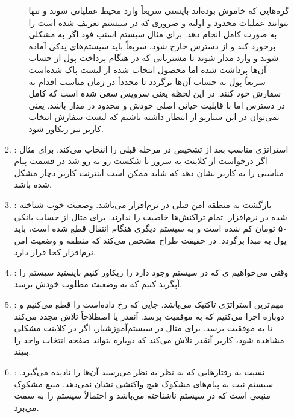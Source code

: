 \begin{enumerate}
\begin{enumerate}
\begin{enumerate}
            گره‌هایی که خاموش بوده‌اند بایستی سریعاً وارد محیط عملیاتی شوند و
            تنها بتوانند عملیات محدود و اولیه و ضروری که در سیستم تعریف شده است
            را به صورت کامل انجام دهد. برای مثال سیستم اسنپ فود اگر به مشکلی
            برخورد کند و از دسترس خارج شود، سریعاً باید سیستم‌های یدکی آماده
            شوند و وارد مدار شوند تا مشتریانی که در هنگام پرداخت پول از حساب
            آن‌ها پرداشت شده اما محصول انتخاب شده از لیست پاک شده‌است سریعاً پول
            به حساب آن‌ها برگردد تا مجدداً در زمان مناسب اقدام به سفارش خود
            کنند. در این لحظه یعنی سرویس  سعی شده است که کامل در
            دسترس اما با قابلیت حیاتی اصلی خودش و محدود در مدار باشد. یعنی
            نمی‌توان در این سناریو از  انتظار داشته باشیم که لیست
            سفارش انتخاب کاربر نیز ریکاور شود.
        \end{enumerate}
        \item {}: استراتژی مناسب بعد از تشخیص
         در مرحله قبلی را انتخاب می‌کند. برای مثال اگر درخواست از
        کلاینت به سرور با شکست رو به رو شد در قسمت  پیام مناسبی را
        به کاربر نشان دهد که شاید ممکن است اینترنت کاربر دچار مشکل شده باشد.
        \item {}: بازگشت به منطقه امن قبلی در نرم‌افزار می‌باشد.
        وضعیت خوب شناخته شده در نرم‌افزار. تمام تراکنش‌ها خاصیت  را
        ندارند. برای مثال از حساب بانکی ۵۰ تومان کم شده است و به سیستم دیگری
        هنگام انتقال قطع شده است، باید پول به مبدا برگردد. در حقیقت طراح مشخص
        می‌کند که منطقه و وضعیت امن نرم‌افزار کجا قرار دارد.
        \item {}: وقتی می‌خواهیم ی که در سیستم وجود
        دارد را ریکاور کنیم بایستید سیستم را آپگرید کنیم که به وضعیت مطلوب خودش
        برسد.
        \item {}: مهم‌ترین استراتژی تاکتیک 
        می‌باشد. جایی که  رخ داده‌است را قطع می‌کنیم و دوباره اجرا
        می‌کنیم که به موفقیت برسد. آنقدر  یا اصطلاحاً تلاش مجدد می‌کند
        تا به موفقیت برسد. برای مثال در سیستم‌آموزشیار، اگر در کلاینت مشکلی
        مشاهده شود، کاربر آنقدر تلاش می‌کند که دوباره بتواند صفحه انتخاب واحد را
        ببیند.
        \item {}: نسبت به رفتار‌هایی که به نظر
         به نظر می‌رسند آن‌ها را نادیده می‌گیرد. سیستم نبت به
        پیام‌های مشکوک هیچ واکنشی نشان نمی‌دهد. منبع مشکوک منبعی است که در سیستم
        ناشناخته می‌باشد و احتمالاً سیستم را به سمت  می‌برد.

\end{enumerate}
\end{enumerate}
